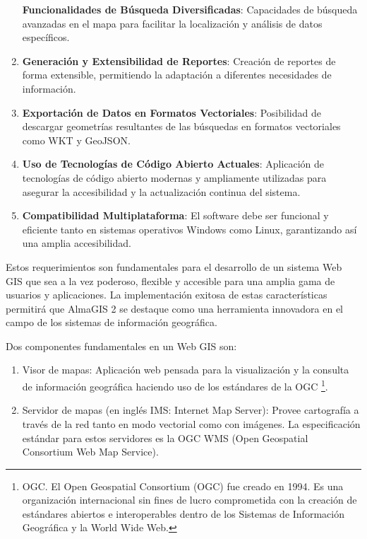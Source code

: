 \begin{enumerate}
  \textbf{Funcionalidades de Búsqueda Diversificadas}: Capacidades de
  búsqueda avanzadas en el mapa para facilitar la localización y
  análisis de datos específicos.
\item
  \textbf{Generación y Extensibilidad de Reportes}: Creación de reportes
  de forma extensible, permitiendo la adaptación a diferentes
  necesidades de información.
\item
  \textbf{Exportación de Datos en Formatos Vectoriales}: Posibilidad de
  descargar geometrías resultantes de las búsquedas en formatos
  vectoriales como WKT y GeoJSON.
\item
  \textbf{Uso de Tecnologías de Código Abierto Actuales}: Aplicación de
  tecnologías de código abierto modernas y ampliamente utilizadas para
  asegurar la accesibilidad y la actualización continua del sistema.
\item
  \textbf{Compatibilidad Multiplataforma}: El software debe ser
  funcional y eficiente tanto en sistemas operativos Windows como Linux,
  garantizando así una amplia accesibilidad.
\end{enumerate}

Estos requerimientos son fundamentales para el desarrollo de un sistema
Web GIS que sea a la vez poderoso, flexible y accesible para una amplia
gama de usuarios y aplicaciones. La implementación exitosa de estas
características permitirá que AlmaGIS 2 se destaque como una herramienta
innovadora en el campo de los sistemas de información geográfica.

Dos componentes fundamentales en un Web GIS son:

\begin{enumerate}
\def\labelenumi{\arabic{enumi}.}
\item
  Visor de mapas: Aplicación web pensada para la visualización y la
  consulta de información geográfica haciendo uso de los estándares de
  la OGC \footnote{OGC. El Open Geospatial Consortium (OGC) fue creado
    en 1994. Es una organización internacional sin fines de lucro
    comprometida con la creación de estándares abiertos e interoperables
    dentro de los Sistemas de Información Geográfica y la World Wide
    Web.}. \parencite{andorra-visor-de-mapas}
\item
  Servidor de mapas (en inglés IMS: Internet Map Server): Provee
  cartografía a través de la red tanto en modo vectorial como con
  imágenes. La especificación estándar para estos servidores es la OGC
  WMS (Open Geospatial Consortium Web Map Service). \parencite{panorama-sig-libre-servidores}
\end{enumerate}

